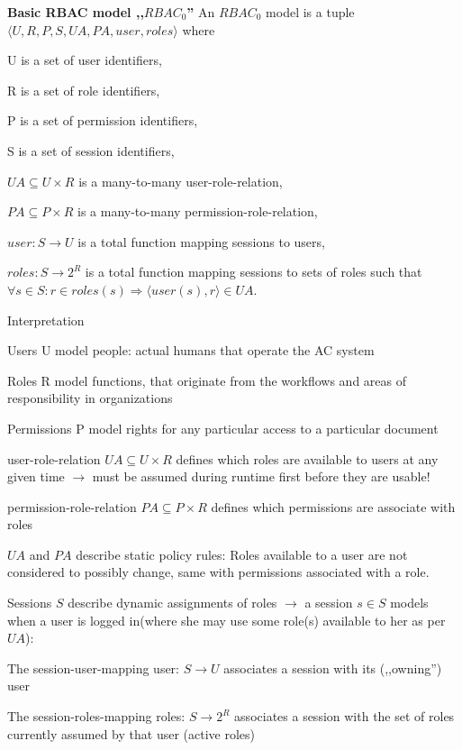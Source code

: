 \documentclass[a4paper]{article}
\renewcommand{\note}[2]{\begin{noteBox} \textbf{#1} #2 \end{noteBox}}
\begin{document}
\begin{multicols}{3}
    \note{Basic RBAC model ,,$RBAC_0$''}{An $RBAC_0$ model is a tuple $\langle U,R,P,S,UA,PA,user,roles\rangle$ where
        \begin{itemize*}
            \item U is a set of user identifiers,
            \item R is a set of role identifiers,
            \item P is a set of permission identifiers,
            \item S is a set of session identifiers,
            \item $UA\subseteq U\times R$ is a many-to-many user-role-relation,
            \item $PA\subseteq P\times R$ is a many-to-many permission-role-relation,
            \item $user:S\rightarrow U$ is a total function mapping sessions to users,
            \item $roles:S\rightarrow 2^R$ is a total function mapping sessions to sets of roles such that $\forall s\in S:r\in roles(s)\Rightarrow \langle user(s),r\rangle \in UA$.
        \end{itemize*}
    }

    Interpretation
    \begin{itemize*}
        \item Users U model people: actual humans that operate the AC system
        \item Roles R model functions, that originate from the workflows and areas of responsibility in organizations
        \item Permissions P model rights for any particular access to a particular document
        \item user-role-relation $UA\subseteq U\times R$ defines which roles are available to users at any given time $\rightarrow$ must be assumed during runtime first before they are usable!
        \item permission-role-relation $PA\subseteq P\times R$ defines which permissions are associate with roles
        \item $UA$ and $PA$ describe static policy rules: Roles available to a user are not considered to possibly change, same with permissions associated with a role.
        \item Sessions $S$ describe dynamic assignments of roles $\rightarrow$ a session $s\in S$ models when a user is logged in(where she may use some role(s) available to her as per $UA$):
        \begin{itemize*}
            \item The session-user-mapping user: $S\rightarrow U$ associates a session with its (,,owning'') user
            \item The session-roles-mapping roles: $S\rightarrow 2^R$ associates a session with the set of roles currently assumed by that user (active roles)
        \end{itemize*}
    \end{itemize*}


\end{multicols}
\end{document}
